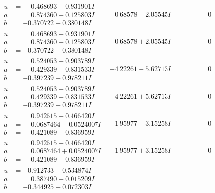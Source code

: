 \documentclass[1p]{elsarticle_modified}
\theoremstyle{definition}
\begin{document}
$$\begin{array}{c|c|c}
\begin{aligned}
u &= \phantom{-}0.468693 + 0.931901 I \\
a &= \phantom{-}0.874360 - 0.125803 I \\
b &= -0.370722 + 0.380148 I\end{aligned}
 & -0.68578 - 2.05545 I & \phantom{-0.000000 } 0 \\ \hline\begin{aligned}
u &= \phantom{-}0.468693 - 0.931901 I \\
a &= \phantom{-}0.874360 + 0.125803 I \\
b &= -0.370722 - 0.380148 I\end{aligned}
 & -0.68578 + 2.05545 I & \phantom{-0.000000 } 0 \\ \hline\begin{aligned}
u &= \phantom{-}0.524053 + 0.903789 I \\
a &= \phantom{-}0.429339 + 0.831533 I \\
b &= -0.397239 + 0.978211 I\end{aligned}
 & -4.22261 - 5.62713 I & \phantom{-0.000000 } 0 \\ \hline\begin{aligned}
u &= \phantom{-}0.524053 - 0.903789 I \\
a &= \phantom{-}0.429339 - 0.831533 I \\
b &= -0.397239 - 0.978211 I\end{aligned}
 & -4.22261 + 5.62713 I & \phantom{-0.000000 } 0 \\ \hline\begin{aligned}
u &= \phantom{-}0.942515 + 0.466420 I \\
a &= \phantom{-}0.0687464 - 0.0524007 I \\
b &= \phantom{-}0.421089 - 0.836959 I\end{aligned}
 & -1.95977 - 3.15258 I & \phantom{-0.000000 } 0 \\ \hline\begin{aligned}
u &= \phantom{-}0.942515 - 0.466420 I \\
a &= \phantom{-}0.0687464 + 0.0524007 I \\
b &= \phantom{-}0.421089 + 0.836959 I\end{aligned}
 & -1.95977 + 3.15258 I & \phantom{-0.000000 } 0 \\ \hline\begin{aligned}
u &= -0.912733 + 0.534874 I \\
a &= \phantom{-}0.387490 - 0.015209 I \\
b &= -0.344925 - 0.072303 I\end{aligned}

\end{array}$$
\end{document}

